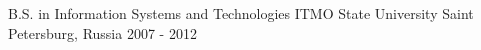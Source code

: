 

\begin{cventries}

  \cventry
    {B.S. in Information Systems and Technologies} %
    {ITMO State University} %
    {Saint Petersburg, Russia} %
    {2007 - 2012} %
    {}

\end{cventries}
